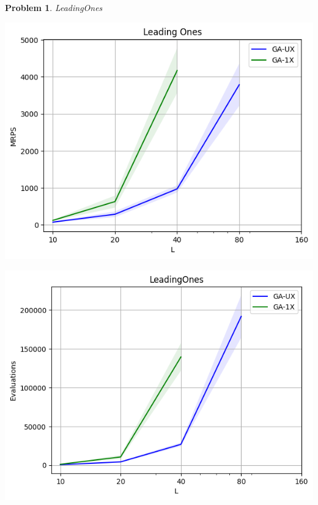 \documentclass[12pt]{article}
\newtheorem{problem}{Problem}
\begin{document}
\newpage
\begin{problem}
	LeadingOnes
\end{problem}
\begin{minipage}{0.5\linewidth}
	\includegraphics*[scale=0.5]{LeadingOnes_MRPS.png}
\end{minipage}
\begin{minipage}{0.5\linewidth}
	\includegraphics*[scale=0.5]{LeadingOnes_Evaluations.png}
\end{minipage}
\end{document}
